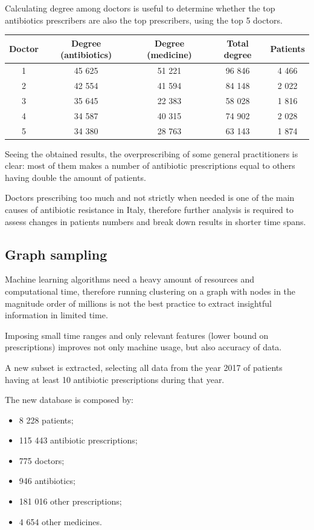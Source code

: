 Calculating degree among doctors is useful to determine whether the top antibiotics prescribers are also the top prescribers, using the top 5 doctors.

\begin{center}
	\begin{tabular}{c|c|c|c|c}
		Doctor & Degree (antibiotics) & Degree (medicine) & Total degree & Patients \\
		\hline
		1 & 45 625 & 51 221 & 96 846 & 4 466 \\
		\hline
		2 & 42 554 & 41 594 & 84 148 & 2 022 \\
		\hline
		3 & 35 645 & 22 383 & 58 028 & 1 816 \\
		\hline
		4 & 34 587 & 40 315 & 74 902 & 2 028 \\
		\hline
		5 & 34 380 & 28 763 & 63 143 & 1 874
	\end{tabular}
\end{center}

Seeing the obtained results, the overprescribing of some general practitioners is clear: most of them makes a number of antibiotic prescriptions equal to others having double the amount of patients.

Doctors prescribing too much and not strictly when needed is one of the main causes of antibiotic resistance in Italy, therefore further analysis is required to assess changes in patients numbers and break down results in shorter time spans.

\subsection{Graph sampling}
Machine learning algorithms need a heavy amount of resources and computational time, therefore running clustering on a graph with nodes in the magnitude order of millions is not the best practice to extract insightful information in limited time.

Imposing small time ranges and only relevant features (lower bound on prescriptions) improves not only machine usage, but also accuracy of data. 

A new subset is extracted, selecting all data from the year 2017 of patients having at least 10 antibiotic prescriptions during that year.

The new database is composed by:
\begin{itemize}
	\item 8 228 patients;
	\item 115 443 antibiotic prescriptions;
	\item 775 doctors;
	\item 946 antibiotics;
	\item 181 016 other prescriptions;
	\item 4 654 other medicines.
\end{itemize}

